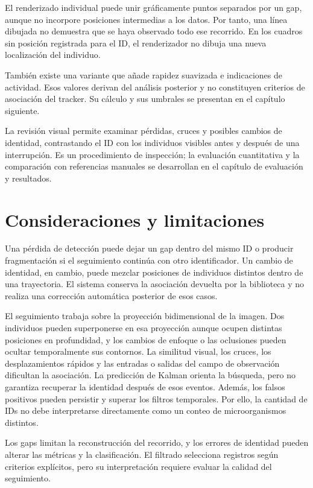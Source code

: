 El renderizado individual puede unir gráficamente puntos separados por un gap, aunque no incorpore posiciones intermedias a los datos. Por tanto, una línea dibujada no demuestra que se haya observado todo ese recorrido. En los cuadros sin posición registrada para el ID, el renderizador no dibuja una nueva localización del individuo.

También existe una variante que añade rapidez suavizada e indicaciones de actividad. Esos valores derivan del análisis posterior y no constituyen criterios de asociación del tracker. Su cálculo y sus umbrales se presentan en el capítulo siguiente.

La revisión visual permite examinar pérdidas, cruces y posibles cambios de identidad, contrastando el ID con los individuos visibles antes y después de una interrupción. Es un procedimiento de inspección; la evaluación cuantitativa y la comparación con referencias manuales se desarrollan en el capítulo de evaluación y resultados.

\section{Consideraciones y limitaciones}

Una pérdida de detección puede dejar un gap dentro del mismo ID o producir fragmentación si el seguimiento continúa con otro identificador. Un cambio de identidad, en cambio, puede mezclar posiciones de individuos distintos dentro de una trayectoria. El sistema conserva la asociación devuelta por la biblioteca y no realiza una corrección automática posterior de esos casos.

El seguimiento trabaja sobre la proyección bidimensional de la imagen. Dos individuos pueden superponerse en esa proyección aunque ocupen distintas posiciones en profundidad, y los cambios de enfoque o las oclusiones pueden ocultar temporalmente sus contornos. La similitud visual, los cruces, los desplazamientos rápidos y las entradas o salidas del campo de observación dificultan la asociación. La predicción de Kalman orienta la búsqueda, pero no garantiza recuperar la identidad después de esos eventos. Además, los falsos positivos pueden persistir y superar los filtros temporales. Por ello, la cantidad de IDs no debe interpretarse directamente como un conteo de microorganismos distintos.

Los gaps limitan la reconstrucción del recorrido, y los errores de identidad pueden alterar las métricas y la clasificación. El filtrado selecciona registros según criterios explícitos, pero su interpretación requiere evaluar la calidad del seguimiento.
